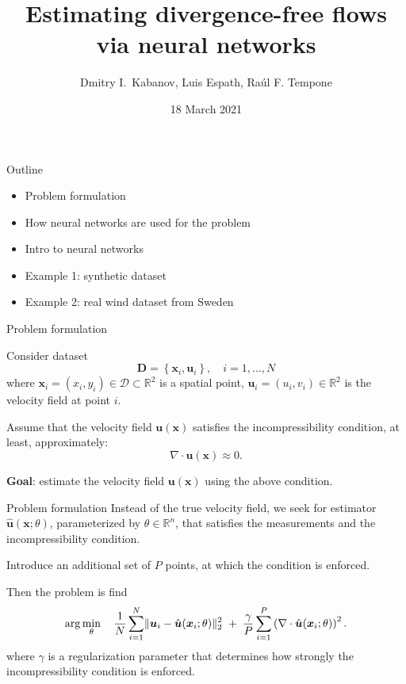 \documentclass{beamer}
\title{Estimating divergence-free flows via neural networks}
\author{Dmitry I.\ Kabanov, Luis Espath, Ra\'ul F. Tempone}
\institute{}
\date{18 March 2021}
\renewcommand{\vec}[1]{\boldsymbol{#1}}
\newcommand{\R}{\mathbb R}
\DeclarePairedDelimiter\norm{\lVert}{\rVert}
\begin{document}
\maketitle

\begin{frame}{Outline}
\begin{itemize}
    \item Problem formulation
    \item How neural networks are used for the problem
    \item Intro to neural networks
    \item Example 1: synthetic dataset
    \item Example 2: real wind dataset from Sweden
\end{itemize}
\end{frame}

\begin{frame}{Problem formulation}

Consider dataset
\[
    \vec{D} = \left\{\vec{x}_i, \vec{u}_i\right\}, \quad i = 1, ..., N
\]
where $\vec{x}_i = (x_i, y_i) \in \mathcal D \subset \R^2$ is a spatial point,
$\vec{u}_i = (u_i, v_i) \in \R^2$ is the velocity field at point $i$.

Assume that the velocity field $\vec u (\vec x)$ satisfies the incompressibility
condition, at least, approximately:
\[
    \nabla \cdot \vec u (\vec x) \approx 0.
\]

\textbf{Goal}: estimate the velocity field $\vec u  (\vec x)$ using the above
condition.
\end{frame}

\begin{frame}{Problem formulation}
Instead of the true velocity field, we seek for estimator
$\hat{\vec u} (\vec x; \theta)$,
parameterized by $\theta \in \R^n$, that satisfies
the measurements and the incompressibility condition.

Introduce an additional set of $P$ points, at which the condition is enforced.

Then the problem is find
\[
    \arg \min_\theta \quad
        \frac{1}{N} \sum_{i=1}^N \norm{\vec u_i - \hat{\vec u}(\vec x_i; \theta)}^2_2
        \ + \;
        \frac{\gamma}{P} \sum_{i=1}^P \left( \nabla \cdot \hat{\vec u}(\vec x_i; \theta)\right)^2.
\]
where $\gamma$ is a regularization parameter that determines how strongly
the incompressibility condition is enforced.
\end{frame}
\end{document}
